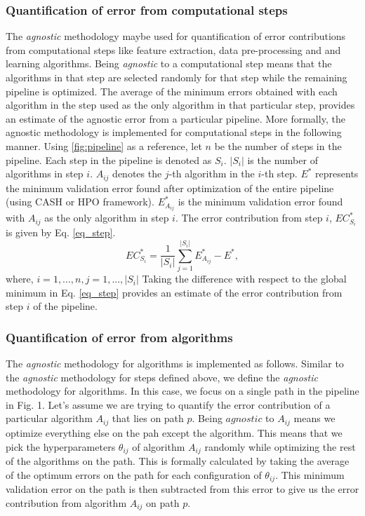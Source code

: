 \subsubsection{Quantification of error from computational steps}
The \textit{agnostic} methodology maybe used for quantification of error contributions from computational steps like feature extraction, data pre-processing and and learning algorithms. Being \textit{agnostic} to a computational step means that the algorithms in that step are selected randomly for that step while the remaining pipeline is optimized. The average of the minimum errors obtained with each algorithm in the step used as the only algorithm in that particular step, provides an estimate of the agnostic error from a particular pipeline.  
More formally, the agnostic methodology is implemented for computational steps in the following manner. Using \ref{fig:pipeline} as a reference, let $n$ be the number of steps in the pipeline. Each step in the pipeline is denoted as $S_i$. $|S_i|$ is the number of algorithms in step $i$. $A_{ij}$ denotes the $j$-th algorithm in the $i$-th step. $E^*$ represents the minimum validation error found after optimization of the entire pipeline (using CASH or HPO framework). $E_{A_{ij}}^*$ is the minimum  validation error found with $A_{ij}$ as the only algorithm in step $i$. The error contribution from step $i$, $EC_{S_i}^*$ is given by Eq. \ref{eq_step}.
\begin{equation}
\label{eq_step}
EC_{S_i}^* = \frac{1}{|S_i|}\sum_{j=1}^{|S_i|} E_{A_{ij}}^* - E^*,
\end{equation}
where, $i = {1, ..., n}, j = {1, ..., |S_i|}$
Taking the difference with respect to the global minimum in Eq. \ref{eq_step} provides an estimate of the error contribution from step $i$ of the pipeline.

\subsubsection{Quantification of error from algorithms}
The \textit{agnostic} methodology for algorithms is implemented as follows. Similar to the \textit{agnostic} methodology for steps defined above, we define the \textit{agnostic} methodology for algorithms. In this case, we focus on a single path in the pipeline in Fig. 1. Let's assume we are trying to quantify the error contribution of a particular algorithm $A_{ij}$ that lies on path $p$. Being $agnostic$ to $A_{ij}$ means we optimize everything else on the pah except the algorithm. This means that we pick the hyperparameters $\theta_{ij}$ of algorithm $A_{ij}$ randomly while optimizing the rest of the algorithms on the path. This is formally calculated by taking the average of the optimum errors on the path for each configuration of $\theta_{ij}$. This minimum validation error on the path is then subtracted from this error to give us the error contribution from algorithm $A_{ij}$ on path $p$.

